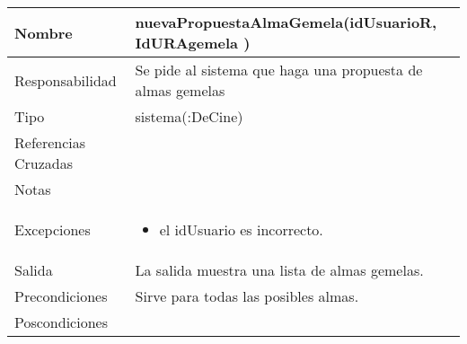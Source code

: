 \documentclass{article}
\begin{document}
\begin{table}[h]
\begin{tabular}{|l|l|l|l|l|l|}
\hline
\multicolumn{2}{|p{3cm}|}{Nombre} & \multicolumn{4}{p{10cm}|}{\textbf{nuevaPropuestaAlmaGemela(idUsuarioR, IdURAgemela )}}\\
\hline
\multicolumn{2}{|p{3cm}|}{Responsabilidad} & \multicolumn{4}{p{10cm}|}{Se pide al sistema que haga una propuesta de almas gemelas} \\
\hline
\multicolumn{2}{|p{3cm}|}{Tipo} & \multicolumn{4}{p{10cm}|}{sistema(:DeCine)} \\
\hline
\multicolumn{2}{|p{3cm}|}{Referencias Cruzadas} & \multicolumn{4}{p{10cm}|}{} \\
\hline
\multicolumn{2}{|p{3cm}|}{Notas} & \multicolumn{4}{p{10cm}|}{} \\
\hline
\multicolumn{2}{|p{3cm}|}{Excepciones} & \multicolumn{4}{p{10cm}|}{\begin{itemize}
\item el idUsuario es incorrecto.
\end{itemize}} \\
\hline
\multicolumn{2}{|p{3cm}|}{Salida} & \multicolumn{4}{p{10cm}|}{La salida muestra una lista de almas gemelas.} \\
\hline
\multicolumn{2}{|p{3cm}|}{Precondiciones} & \multicolumn{4}{p{10cm}|}{Sirve para todas las posibles almas.} \\
\hline
\multicolumn{2}{|p{3cm}|}{Poscondiciones} & \multicolumn{4}{p{10cm}|}{} \\
\hline
\end{tabular}
\end{table}
\end{document}
